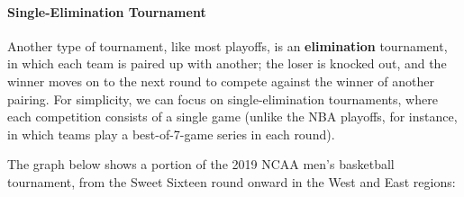 \paragraph{Single-Elimination Tournament} Another type of tournament, like most playoffs, is an \textbf{elimination} tournament, in which each team is paired up with another; the loser is knocked out, and the winner moves on to the next round to compete against the winner of another pairing.  For simplicity, we can focus on single-elimination tournaments, where each competition consists of a single game (unlike the NBA playoffs, for instance, in which teams play a best-of-7-game series in each round).

The graph below shows a portion of the 2019 NCAA men's basketball tournament, from the Sweet Sixteen round onward in the West and East regions:
